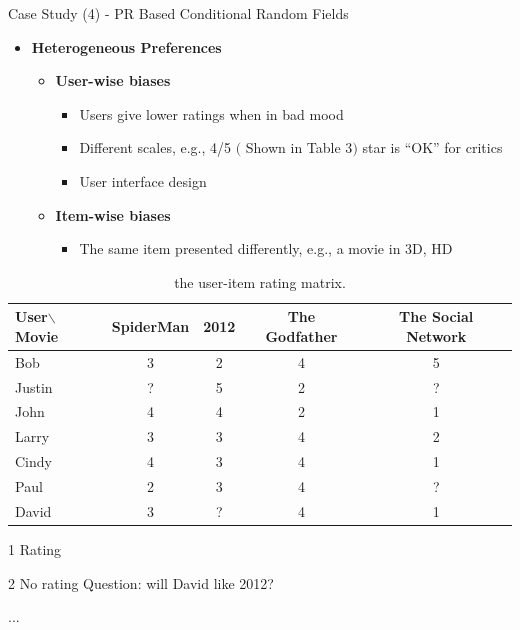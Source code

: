 \documentclass[
 size=14pt,
 paper=smartboard,  %
 mode=present, 		%
 display=slides, 	%
 pauseslide,
 fleqn,leqno]{powerdot}{}
\begin{document}
\begin{slide}{Case Study (4) - PR Based Conditional Random Fields}

\begin{itemize}
	\item  \textbf{Heterogeneous Preferences}

\begin{itemize}
	\item \textbf{User-wise biases}
	\setlength\itemsep{-0.5em}
\begin{itemize}
	\setlength\itemsep{-0.3em}
	\item Users give lower ratings when in bad mood

	\item Different scales, e.g., 4/5 $($ Shown in Table 3$)$ star is ``OK'' for critics

	\item User interface design

\end{itemize}

\item \textbf{Item-wise biases}

	\setlength\itemsep{-0.5em}
\begin{itemize}

	\item The same item presented differently,
e.g., a movie in 3D, HD

\end{itemize}
\end{itemize}
\end{itemize}

\vspace*{-45pt}
\begin{table}[h]
	\fontsize{11pt}{11pt}\selectfont
	\setlength{\abovecaptionskip}{0pt}
	\setlength{\belowcaptionskip}{1pt}
	\centering
	\caption{the user-item rating matrix.}
	\begin{threeparttable}
			\begin{tabular}{l|c|c|c|c}	
			\toprule
			\textbf{User$\backslash$Movie}  	&  	\textbf{Spider\-Man}		& 		\textbf{2012} 		& 		\textbf{The Godfather} 		& 	\textbf{The Social Network}\\
			\midrule
			Bob	&	3	&	2 	&	4	&	5	\\
			Justin	&	?	&	5   &	2	&	?	\\
			John	&	4	&	4 	&	2	&	1	\\
			Larry	&	3	&	3 	&	4	&	2	\\
			Cindy	&	4	&	3 	&	4	&	1	\\
			Paul	&	2	&	3 	&	4	&	?	\\
			David	&	3 \tnote{1}	&	? \tnote{2}	&	4	&	1	\\
			\bottomrule
		\end{tabular}
		\begin{tablenotes}
			\item[1] Rating
			\item[2] No rating Question: will David like 2012?
		\end{tablenotes}...
	\end{threeparttable}


\end{table}
\end{slide}
\end{document}
